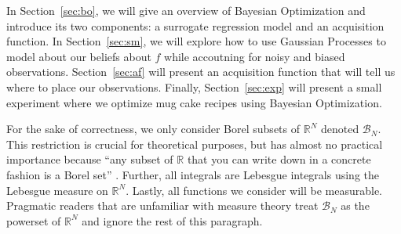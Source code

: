 In Section~\ref{sec:bo}, we will give an overview of Bayesian Optimization and introduce its two components: a surrogate regression model and an acquisition function.
In Section~\ref{sec:sm}, we will explore how to use Gaussian Processes
to model about our beliefs about $f$ while accoutning for noisy and biased observations.
Section~\ref{sec:af} will present an acquisition function that will tell us where to place our observations.
Finally, Section~\ref{sec:exp} will present a small experiment where we optimize mug cake recipes using Bayesian Optimization.

For the sake of correctness, we only consider Borel subsets of $\mathbb{R}^{N}$ denoted $\mathcal{B}_N$.
This restriction is crucial for theoretical purposes, but has almost no practical importance because
 ``any subset of $\mathbb{R}$ that you can write down in a concrete fashion is a Borel set'' \cite{axler2020}.
Further, all integrals are Lebesgue integrals using the Lebesgue measure on $\mathbb{R}^{N}$.
Lastly, all functions we consider will be measurable.
Pragmatic readers that are unfamiliar with measure theory treat $\mathcal{B}_N$ as the powerset of $\mathbb{R}^{N}$ and ignore the rest of this paragraph.
